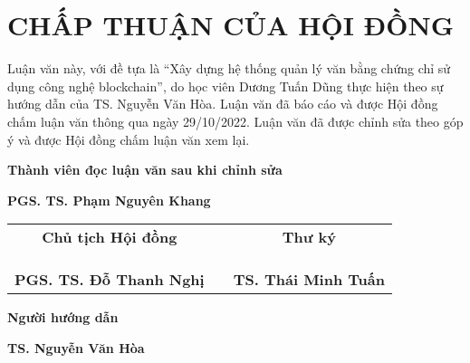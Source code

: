 \chapter*{CHẤP THUẬN CỦA HỘI ĐỒNG}
Luận văn này, với đề tựa là “Xây dựng hệ thống quản lý văn bằng chứng chỉ sử dụng công nghệ blockchain”, do học viên Dương Tuấn Dũng thực hiện theo sự hướng dẫn của TS. Nguyễn Văn Hòa. Luận văn đã báo cáo và được Hội đồng chấm luận văn thông qua ngày 29/10/2022. Luận văn đã được chỉnh sửa theo góp ý và được Hội đồng chấm luận văn xem lại.
\begin{center}
\textbf{Thành viên đọc luận văn sau khi chỉnh sửa}

\vspace{30mm}

\textbf{PGS. TS. Phạm Nguyên Khang}
\end{center}

\begin{center}
\renewcommand{\arraystretch}{1.5}
\begin{longtable}{ccc}

\textbf{Chủ tịch Hội đồng} &\hspace{20mm} & \textbf{Thư ký} \\ 
\\
\\
\\
\textbf{PGS. TS. Đỗ Thanh Nghị}  & & \textbf{TS. Thái Minh Tuấn}  \\ 

\end{longtable}
\end{center}

\begin{center}
\textbf{Người hướng dẫn}
\vspace{30mm}

 \textbf{TS. Nguyễn Văn Hòa}
\end{center}


